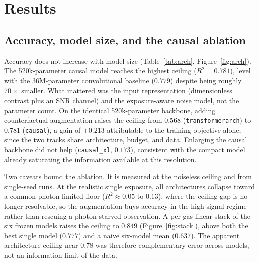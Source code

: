 \documentclass[11pt,twocolumn]{article}
\begin{document}
\section{Results}

\subsection{Accuracy, model size, and the causal ablation}
\label{sec:accuracy}

Accuracy does not increase with model size (Table~\ref{tab:arch},
Figure~\ref{fig:arch}). The 520k-parameter causal model reaches the highest
ceiling ($R^2{=}0.781$), level with the 36M-parameter convolutional baseline
($0.779$) despite being roughly $70\times$ smaller. What mattered was the input
representation (dimensionless contrast plus an SNR channel) and the
exposure-aware noise model, not the parameter count. On the identical
520k-parameter backbone, adding counterfactual augmentation raises the ceiling
from $0.568$ (\texttt{transformerarch}) to $0.781$ (\texttt{causal}), a gain of
$+0.213$ attributable to the training objective alone, since the two tracks share
architecture, budget, and data. Enlarging the causal backbone did not help
(\texttt{causal\_xl}, $0.173$), consistent with the compact model already
saturating the information available at this resolution.

Two caveats bound the ablation. It is measured at the noiseless ceiling and from
single-seed runs. At the realistic single exposure, all architectures collapse
toward a common photon-limited floor ($R^2\!\approx\!0.05$ to $0.13$), where the
ceiling gap is no longer resolvable, so the augmentation buys accuracy in the
high-signal regime rather than rescuing a photon-starved observation. A per-gas
linear stack of the six frozen models raises the ceiling to $0.849$
(Figure~\ref{fig:stack}), above both the best single model ($0.777$) and a naive
six-model mean ($0.637$). The apparent architecture ceiling near $0.78$ was
therefore complementary error across models, not an information limit of the
data.
\end{document}
